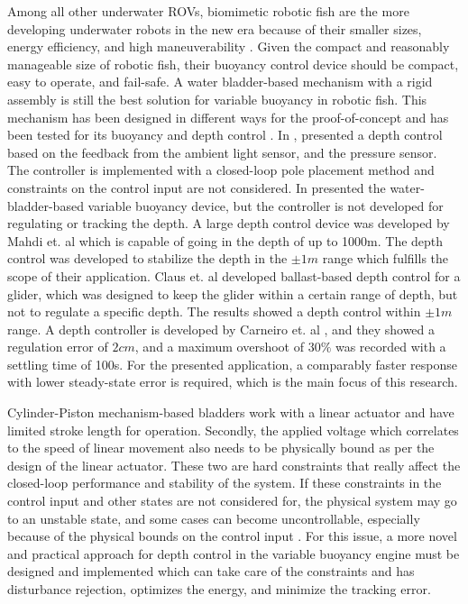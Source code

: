 \documentclass[conference, letterpaper]{IEEEtran}
\begin{document}
Among all other underwater ROVs, biomimetic robotic fish are the more developing underwater robots in the new era because of their smaller sizes, energy efficiency, and high maneuverability \cite{Duraisamy2019DesignReview, Liu2022AWing,Xie2021DesignsReview}.  Given the compact and reasonably manageable size of robotic fish, their buoyancy control device should be compact, easy to operate, and fail-safe. A water bladder-based mechanism with a rigid assembly is still the best solution for variable buoyancy in robotic fish. This mechanism has been designed in different ways for the proof-of-concept and has been tested for its buoyancy and depth control \cite{Yu2017}. In \cite{Vasiljevic2019}, presented a depth control based on the feedback from the ambient light sensor, and the pressure sensor. The controller is implemented with a closed-loop pole placement method and constraints on the control input are not considered. In \cite{Kobayashi2010} presented the water-bladder-based variable buoyancy device, but the controller is not developed for regulating or tracking the depth.  A large depth control device was developed by Mahdi et. al \cite{MahdiCHOYEKH2016} which is capable of going in the depth of up to 1000m. The depth control was developed to stabilize the depth in the $\pm 1 m$ range which fulfills the scope of their application. Claus et. al \cite{Claus2012}  developed ballast-based depth control for a glider, which was designed to keep the glider within a certain range of depth, but not to regulate a specific depth. The results showed a depth control within $\pm 1m $ range. A depth controller is developed by Carneiro et. al \cite{Model2023}, and they showed a regulation error of $2cm$, and a maximum overshoot of $30 \%$ was recorded with a settling time of 100s. For the presented application, a comparably faster response with lower steady-state error is required, which is the main focus of this research.

Cylinder-Piston mechanism-based bladders work with a linear actuator and have limited stroke length for operation. Secondly, the applied voltage which correlates to the speed of linear movement also needs to be physically bound as per the design of the linear actuator. These two are hard constraints that really affect the closed-loop performance and stability of the system. If these constraints in the control input and other states are not  considered for, the physical system may go to an unstable state, and some cases can become uncontrollable, especially because of the physical bounds on the control input \cite{Scokaert1998,Rawlings}. For this issue, a more novel and practical approach for depth control in the variable buoyancy engine must be designed and implemented which can take care of the constraints and has disturbance rejection, optimizes the energy, and minimize the tracking error.
\end{document}
